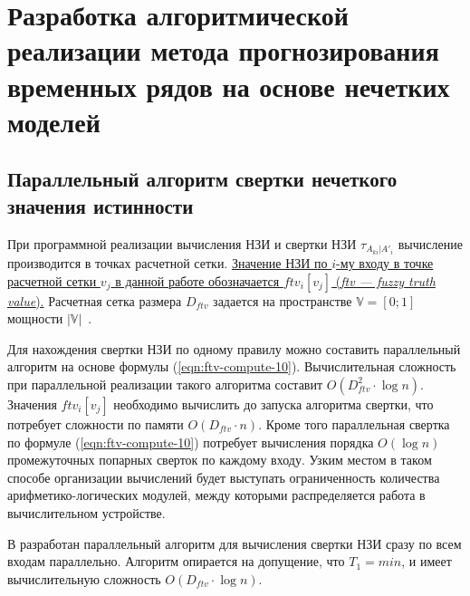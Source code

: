 \chapter{Разработка алгоритмической реализации метода прогнозирования временных рядов на основе нечетких моделей}\label{ch:ch3}



\section{Параллельный алгоритм свертки нечеткого значения истинности}


При программной реализации вычисления НЗИ и свертки НЗИ $\tau_{A_{ki}|A'_i}$ вычисление производится в точках расчетной сетки. \ul{Значение НЗИ по $i$-му входу в точке расчетной сетки $v_j$ в данной работе обозначается $ftv_i[v_j]$ (\textit{ftv --- fuzzy truth value}).} Расчетная сетка размера $D_{ftv}$ задается на пространстве $\mathbb{V}=[0;1]$ мощности $|\mathbb{V}|$~\cite{RyzhovFuzzySets,Leonenkov2005FuzzyModeling}.

Для нахождения свертки НЗИ по одному правилу можно составить параллельный алгоритм на основе формулы (\ref{eqn:ftv-compute-10}). Вычислительная сложность при параллельной реализации такого алгоритма составит $O\left(D_{ftv}^2 \cdot \log{n}\right)$. Значения $ftv_i[v_j]$ необходимо вычислить до запуска алгоритма свертки, что потребует сложности по памяти $O\left(D_{ftv}\cdot n\right)$. Кроме того параллельная свертка по формуле (\ref{eqn:ftv-compute-10}) потребует вычисления порядка $O(\log n)$ промежуточных попарных сверток по каждому входу. Узким местом в таком способе организации вычислений будет выступать ограниченность количества арифметико-логических модулей, между которыми распределяется работа в вычислительном устройстве.

В \cite{Karatach2024,SinukKaratach2020} разработан параллельный алгоритм для вычисления свертки НЗИ сразу по всем входам параллельно. Алгоритм опирается на допущение, что  $T_1 = min$, и имеет вычислительную сложность $O\left(D_{ftv}\cdot \log{n}\right)$.

